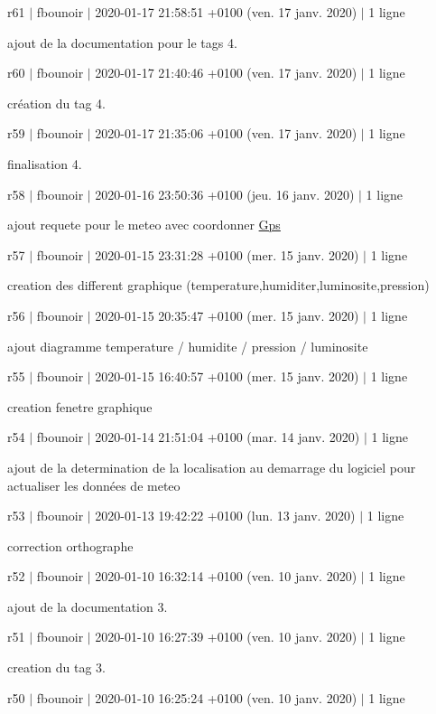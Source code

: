 r61 $\vert$ fbounoir $\vert$ 2020-\/01-\/17 21\+:58\+:51 +0100 (ven. 17 janv. 2020) $\vert$ 1 ligne

ajout de la documentation pour le tags 4.

r60 $\vert$ fbounoir $\vert$ 2020-\/01-\/17 21\+:40\+:46 +0100 (ven. 17 janv. 2020) $\vert$ 1 ligne

création du tag 4.

r59 $\vert$ fbounoir $\vert$ 2020-\/01-\/17 21\+:35\+:06 +0100 (ven. 17 janv. 2020) $\vert$ 1 ligne

finalisation 4.

r58 $\vert$ fbounoir $\vert$ 2020-\/01-\/16 23\+:50\+:36 +0100 (jeu. 16 janv. 2020) $\vert$ 1 ligne

ajout requete pour le meteo avec coordonner \hyperlink{class_gps}{Gps}

r57 $\vert$ fbounoir $\vert$ 2020-\/01-\/15 23\+:31\+:28 +0100 (mer. 15 janv. 2020) $\vert$ 1 ligne

creation des different graphique (temperature,humiditer,luminosite,pression)

r56 $\vert$ fbounoir $\vert$ 2020-\/01-\/15 20\+:35\+:47 +0100 (mer. 15 janv. 2020) $\vert$ 1 ligne

ajout diagramme temperature / humidite / pression / luminosite

r55 $\vert$ fbounoir $\vert$ 2020-\/01-\/15 16\+:40\+:57 +0100 (mer. 15 janv. 2020) $\vert$ 1 ligne

creation fenetre graphique

r54 $\vert$ fbounoir $\vert$ 2020-\/01-\/14 21\+:51\+:04 +0100 (mar. 14 janv. 2020) $\vert$ 1 ligne

ajout de la determination de la localisation au demarrage du logiciel pour actualiser les données de meteo

r53 $\vert$ fbounoir $\vert$ 2020-\/01-\/13 19\+:42\+:22 +0100 (lun. 13 janv. 2020) $\vert$ 1 ligne

correction orthographe

r52 $\vert$ fbounoir $\vert$ 2020-\/01-\/10 16\+:32\+:14 +0100 (ven. 10 janv. 2020) $\vert$ 1 ligne

ajout de la documentation 3.

r51 $\vert$ fbounoir $\vert$ 2020-\/01-\/10 16\+:27\+:39 +0100 (ven. 10 janv. 2020) $\vert$ 1 ligne

creation du tag 3.

r50 $\vert$ fbounoir $\vert$ 2020-\/01-\/10 16\+:25\+:24 +0100 (ven. 10 janv. 2020) $\vert$ 1 ligne


